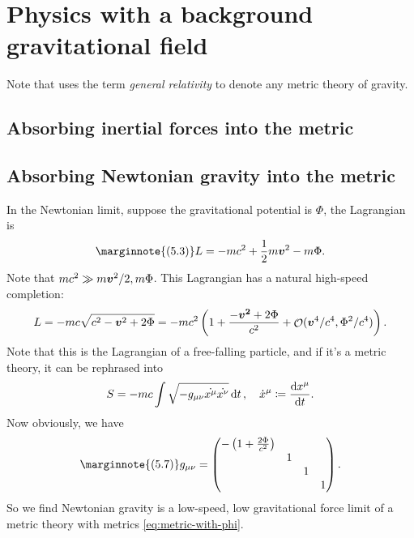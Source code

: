\documentclass[hyperref, a4paper]{article}
\DeclareMathOperator{\bigO}{\mathcal{O}}
\begin{document}
\section{Physics with a background gravitational field}

Note that \cite{bambi2018introduction} uses the term \emph{general relativity} to denote any metric theory of 
gravity. 

\subsection{Absorbing inertial forces into the metric}

\subsection{Absorbing Newtonian gravity into the metric}

In the Newtonian limit, suppose the gravitational potential is $\Phi$, the Lagrangian is 
\begin{equation} \marginnote{(5.3)}
    L = - m c^2 + \frac{1}{2} m \vb*{v}^2 - m \Phi.
\end{equation}
Note that $m c^2 \gg m \vb*{v}^2 / 2, m \Phi$. 
This Lagrangian has a natural high-speed completion:
\begin{equation}
    L = - m c \sqrt{c^2 - \vb*{v}^2 + 2 \Phi} = - m c^2 \left( 1 + \frac{- \vb*{\vb*{v}^2} + 2 \Phi}{c^2} + \bigO(\vb*{v}^4 / c^4, \Phi^2 / c^4) \right) .
\end{equation}
Note that this is the Lagrangian of a free-falling particle, and if it's a metric theory, it can be rephrased into 
\begin{equation}
    S = - m c \int \sqrt{- g_{\mu \nu} \dot{x^\mu} \dot{x^\nu}} \dd{t}, \quad \dot{x}^\mu \coloneqq \dv{x^\mu}{t}.
\end{equation}
Now obviously, we have 
\begin{equation} \marginnote{(5.7)}
    g_{\mu \nu} = \pmqty{\dmat{ -\left(1 + \frac{2\Phi}{c^2}\right), 1, 1, 1 }}. \label{eq:metric-with-phi}
\end{equation}
So we find Newtonian gravity is a low-speed, low gravitational force limit of a metric theory with metrics
\eqref{eq:metric-with-phi}. 
\end{document}
